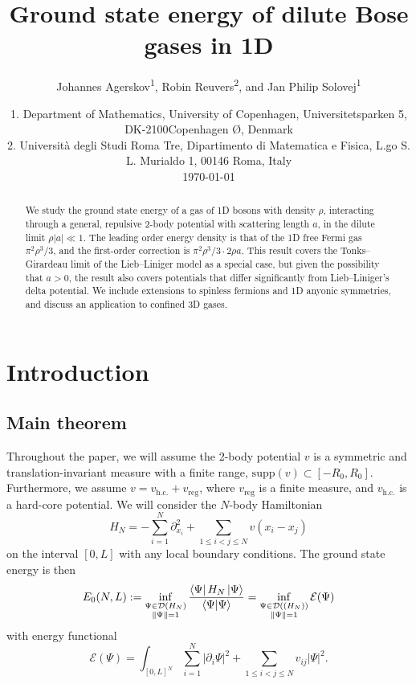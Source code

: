 \documentclass[a4paper,11pt]{article}
\author{Johannes Agerskov\textsuperscript{1}\orcidlink{0000-0002-0533-3221}, Robin Reuvers\textsuperscript{2}\orcidlink{0000-0003-2949-3614}, and Jan Philip Solovej\textsuperscript{1}\orcidlink{0000-0002-0244-1497}}
\date{
1. Department of Mathematics, University of Copenhagen, Universitetsparken 5, DK-2100Copenhagen Ø, Denmark
	\\
2. Universit\`{a} degli Studi Roma Tre, Dipartimento di Matematica e Fisica, L.go S. L. Murialdo 1, 00146 Roma, Italy\\
	\today}
\title{Ground state energy of dilute Bose gases in 1D}
\newcommand{\supp}{\text{supp}}
\newcommand{\abs}[1]{\left\lvert #1 \right\rvert}
\newcommand{\dom}[1]{\mathcal D\left(#1\right)}
\renewcommand{\braket}[1]{\left\langle#1\right\rangle}
\numberwithin{equation}{section}
\begin{document}
\maketitle
\begin{abstract}
We study the ground state energy of a gas of 1D bosons with density $\rho$, interacting through a general, repulsive 2-body potential with scattering length $a$, in the dilute limit $\rho |a|\ll1$. The leading order energy density is that of the 1D free Fermi gas $\pi^2\rho^3/3$, and the first-order correction is $\pi^2\rho^3/3\cdot 2\rho a$. This result covers the Tonks--Girardeau limit of the Lieb--Liniger model as a special case, but given the possibility that $a>0$, the result also covers potentials that differ significantly from Lieb--Liniger's delta potential. We include extensions to spinless fermions and 1D anyonic symmetries, and discuss an application to confined 3D gases.
\end{abstract}


\section{Introduction}
\subsection{Main theorem}
Throughout the paper, we will assume the 2-body potential $v$ is a symmetric and translation-invariant measure with a finite range, $\supp(v)\subset[-R_0,R_0]$. Furthermore, we assume $ v=v_{\text{h.c.}}+v_{\text{reg}} $, where $ v_{\text{reg}} $ is a finite measure, and $ v_{\text{h.c.}} $ is a hard-core potential. We will consider the $N$-body Hamiltonian 
\begin{equation}
\label{H_N}
H_N=-\sum^N_{i=1}\partial^2_{x_i}+\sum_{1\leq i<j\leq N}v(x_i-x_j)
\end{equation}
on the interval $[0,L]$ with any local boundary conditions. The ground state energy is then
\begin{equation}
E_0(N,L):=\inf_{\substack{\Psi\in\dom{H_N}\\\|\Psi\|=1}}\frac{\bra{\Psi}H_N\ket{\Psi}}{\braket{\Psi|\Psi}}=\inf_{\substack{\Psi\in\dom{(H_N)}\\\|\Psi\|=1}}\mathcal{E}(\Psi)
\end{equation}
with energy functional
\begin{equation}
\mathcal{E}(\Psi)=\int_{[0,L]^N}\sum_{i=1}^{N}\abs{\partial_i\Psi}^2+\sum_{1\leq i<j\leq N}v_{ij}\abs{\Psi}^2.
\end{equation}
\end{document}
